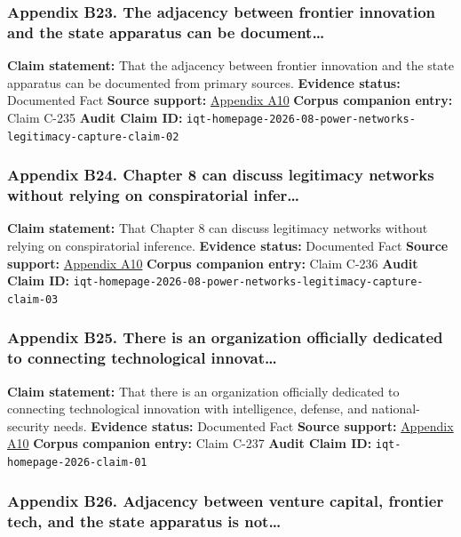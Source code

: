 \documentclass[
  american,
  11pt,
  letterpaper,
]{article}
\begin{document}
\subsubsection{Appendix B23. The adjacency between frontier innovation
and the state apparatus can be
document\ldots{}}\label{ch-07-appendix-b23-the-adjacency-between-frontier-innovation-and-the-state-apparatus-can-be-document}

\textbf{Claim statement:} That the adjacency between frontier innovation
and the state apparatus can be documented from primary sources.
\textbf{Evidence status:} Documented Fact \textbf{Source support:}
\hyperref[ch-07-appendix-a10-in-q-tel]{Appendix A10} \textbf{Corpus
companion entry:} Claim C-235 \textbf{Audit Claim ID:}
\texttt{iqt-homepage-2026-08-power-networks-legitimacy-capture-claim-02}

\subsubsection{Appendix B24. Chapter 8 can discuss legitimacy networks
without relying on conspiratorial
infer\ldots{}}\label{ch-07-appendix-b24-chapter-8-can-discuss-legitimacy-networks-without-relying-on-conspiratorial-infer}

\textbf{Claim statement:} That Chapter 8 can discuss legitimacy networks
without relying on conspiratorial inference. \textbf{Evidence status:}
Documented Fact \textbf{Source support:}
\hyperref[ch-07-appendix-a10-in-q-tel]{Appendix A10} \textbf{Corpus
companion entry:} Claim C-236 \textbf{Audit Claim ID:}
\texttt{iqt-homepage-2026-08-power-networks-legitimacy-capture-claim-03}

\subsubsection{Appendix B25. There is an organization officially
dedicated to connecting technological
innovat\ldots{}}\label{ch-07-appendix-b25-there-is-an-organization-officially-dedicated-to-connecting-technological-innovat}

\textbf{Claim statement:} That there is an organization officially
dedicated to connecting technological innovation with intelligence,
defense, and national-security needs. \textbf{Evidence status:}
Documented Fact \textbf{Source support:}
\hyperref[ch-07-appendix-a10-in-q-tel]{Appendix A10} \textbf{Corpus
companion entry:} Claim C-237 \textbf{Audit Claim ID:}
\texttt{iqt-homepage-2026-claim-01}

\subsubsection{Appendix B26. Adjacency between venture capital, frontier
tech, and the state apparatus is
not\ldots{}}\label{ch-07-appendix-b26-adjacency-between-venture-capital-frontier-tech-and-the-state-apparatus-is-not}
\end{document}
